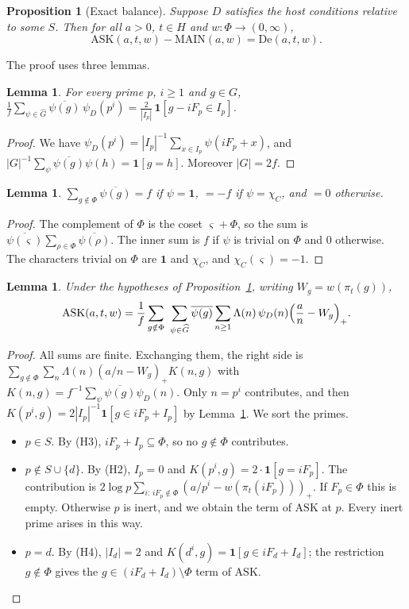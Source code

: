 \documentclass[11pt]{amsart}
\newcommand{\ASK}{\mathrm{ASK}}
\newcommand{\MAIN}{\mathrm{MAIN}}
\newcommand{\De}{\mathrm{De}}
\newcommand{\Gh}{\widehat{G}}
\newcommand{\pa}{\pi}
\theoremstyle{plain}
\newtheorem{proposition}[theorem]{Proposition}
\newtheorem{lemma}[theorem]{Lemma}
\theoremstyle{definition}
\numberwithin{equation}{section}
\begin{document}
\begin{proposition}[Exact balance]\label{prop:balance}
Suppose $D$ satisfies the host conditions relative to some $S$. Then for all $a>0$, $t\in H$ and
$w:\Phi\to(0,\infty)$,
\[
\ASK(a,t,w)-\MAIN(a,w)=\De(a,t,w).
\]
\end{proposition}

The proof uses three lemmas.

\begin{lemma}\label{lem:orth}
For every prime $p$, $i\ge1$ and $g\in G$,
$\displaystyle\frac1f\sum_{\psi\in\Gh}\overline{\psi(g)}\,\psi_D(p^i)=\frac{2}{|I_p|}\,\mathbf 1[g-iF_p\in I_p]$.
\end{lemma}

\begin{proof}
We have $\psi_D(p^i)=|I_p|^{-1}\sum_{x\in I_p}\psi(iF_p+x)$, and
$|G|^{-1}\sum_\psi\overline{\psi(g)}\psi(h)=\mathbf 1[g=h]$. Moreover $|G|=2f$.
\end{proof}

\begin{lemma}\label{lem:colour}
$\displaystyle\sum_{g\notin\Phi}\overline{\psi(g)}=f$ if $\psi=\mathbf 1$, $=-f$ if $\psi=\chi_C$,
and $=0$ otherwise.
\end{lemma}

\begin{proof}
The complement of $\Phi$ is the coset $\varsigma+\Phi$, so the sum is
$\overline{\psi(\varsigma)}\sum_{\rho\in\Phi}\overline{\psi(\rho)}$. The inner sum is $f$ if $\psi$
is trivial on $\Phi$ and $0$ otherwise. The characters trivial on $\Phi$ are $\mathbf 1$ and
$\chi_C$, and $\chi_C(\varsigma)=-1$.
\end{proof}

\begin{lemma}\label{lem:askexp}
Under the hypotheses of Proposition~\ref{prop:balance}, writing $W_g=w(\pa_t(g))$,
\[
\ASK(a,t,w)=\frac1f\sum_{g\notin\Phi}\ \sum_{\psi\in\Gh}\overline{\psi(g)}\sum_{n\ge1}\Lambda(n)\,\psi_D(n)\Bigl(\frac an-W_g\Bigr)_{+}.
\]
\end{lemma}

\begin{proof}
All sums are finite. Exchanging them, the right side is
$\sum_{g\notin\Phi}\sum_{n}\Lambda(n)(a/n-W_g)_+K(n,g)$ with
$K(n,g)=f^{-1}\sum_\psi\overline{\psi(g)}\psi_D(n)$. Only $n=p^i$ contributes, and then
$K(p^i,g)=2|I_p|^{-1}\mathbf 1[g\in iF_p+I_p]$ by Lemma~\ref{lem:orth}. We sort the primes.
\begin{itemize}
\item $p\in S$. By (H3), $iF_p+I_p\subseteq\Phi$, so no $g\notin\Phi$ contributes.
\item $p\notin S\cup\{d\}$. By (H2), $I_p=0$ and $K(p^i,g)=2\cdot\mathbf 1[g=iF_p]$. The
  contribution is $2\log p\sum_{i:\,iF_p\notin\Phi}(a/p^i-w(\pa_t(iF_p)))_+$. If $F_p\in\Phi$ this is
  empty. Otherwise $p$ is inert, and we obtain the term of $\ASK$ at $p$. Every inert prime arises
  in this way.
\item $p=d$. By (H4), $|I_d|=2$ and $K(d^i,g)=\mathbf 1[g\in iF_d+I_d]$; the restriction $g\notin\Phi$
  gives the $g\in(iF_d+I_d)\setminus\Phi$ term of $\ASK$.\qedhere
\end{itemize}
\end{proof}
\end{document}
